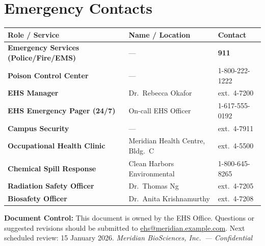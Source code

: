\section{Emergency Contacts}

\begin{tabularx}{\linewidth}{@{}>{\bfseries\color{accent}}l >{\raggedright\arraybackslash}X l@{}}
  \rowcolor{accent}
  \color{white}Role / Service & \color{white}Name / Location & \color{white}Contact \\
  \midrule
  Emergency Services (Police/Fire/EMS) & ---                                 & \textbf{911} \\
  Poison Control Center                & ---                                 & 1-800-222-1222 \\
  EHS Manager                          & Dr.\ Rebecca Okafor                 & ext.\ 4-7200 \\
  EHS Emergency Pager (24/7)           & On-call EHS Officer                 & 1-617-555-0192 \\
  Campus Security                      & ---                                 & ext.\ 4-7911 \\
  Occupational Health Clinic           & Meridian Health Centre, Bldg.\ C   & ext.\ 4-5500 \\
  Chemical Spill Response              & Clean Harbors Environmental         & 1-800-645-8265 \\
  Radiation Safety Officer             & Dr.\ Thomas Ng                      & ext.\ 4-7205 \\
  Biosafety Officer                    & Dr.\ Anita Krishnamurthy            & ext.\ 4-7208 \\
\end{tabularx}

\vspace{10pt}
\accentrule
\vspace{4pt}
{\small\color{neutralmid}%
  \textbf{Document Control:} This document is owned by the EHS Office. Questions or suggested
  revisions should be submitted to \href{mailto:ehs@meridian.example.com}{ehs@meridian.example.com}.
  Next scheduled review: 15 January 2026.
  \hfill \textit{Meridian BioSciences, Inc.\ --- Confidential}}

